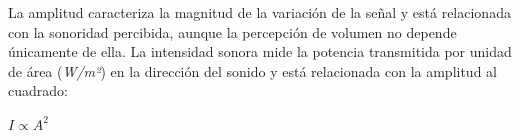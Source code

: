 La amplitud caracteriza la magnitud de la variación de la señal y está relacionada con la sonoridad percibida, aunque la percepción de volumen no depende únicamente de ella.
La intensidad sonora mide la potencia transmitida por unidad de área (\textit{W/m²}) en la dirección del sonido y está relacionada con la amplitud al cuadrado\cite{openstax_intensity}:

\begin{center}
$I \propto A^2$
\end{center}
